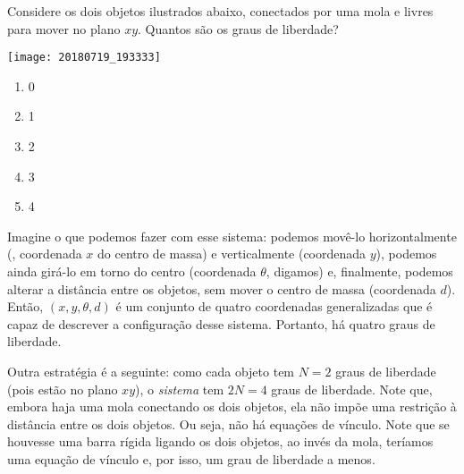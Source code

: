 \begin{question}
    Considere os dois objetos ilustrados abaixo, conectados por uma mola e livres para mover no plano $xy$.
    Quantos são os graus de liberdade?

    \begin{center}
      \texttt{[image: 20180719\_193333]}
    \end{center}

    \begin{enumerate}
      \item 0
      \item 1
      \item 2
      \item 3
      \item 4 \rightanswer
    \end{enumerate}

    \begin{solution}
      Imagine o que podemos fazer com esse sistema: podemos movê-lo horizontalmente (\eg, coordenada $x$ do centro de massa) e verticalmente (coordenada $y$), podemos ainda girá-lo em torno do centro (coordenada $\theta$, digamos) e, finalmente, podemos alterar a distância entre os objetos, sem mover o centro de massa (coordenada $d$).
      Então, $(x,y,\theta,d)$ é um conjunto de quatro coordenadas generalizadas que é capaz de descrever a configuração desse sistema.
      Portanto, há quatro graus de liberdade.

      Outra estratégia é a seguinte: como cada objeto tem $N = 2$ graus de liberdade (pois estão no plano $xy$), o \emph{sistema} tem $2N = 4$ graus de liberdade.
      Note que, embora haja uma mola conectando os dois objetos, ela não impõe uma restrição à distância entre os dois objetos.
      Ou seja, não há equações de vínculo.
      Note que se houvesse uma barra rígida ligando os dois objetos, ao invés da mola, teríamos uma equação de vínculo e, por isso, um grau de liberdade a menos.
    \end{solution}
\end{question}